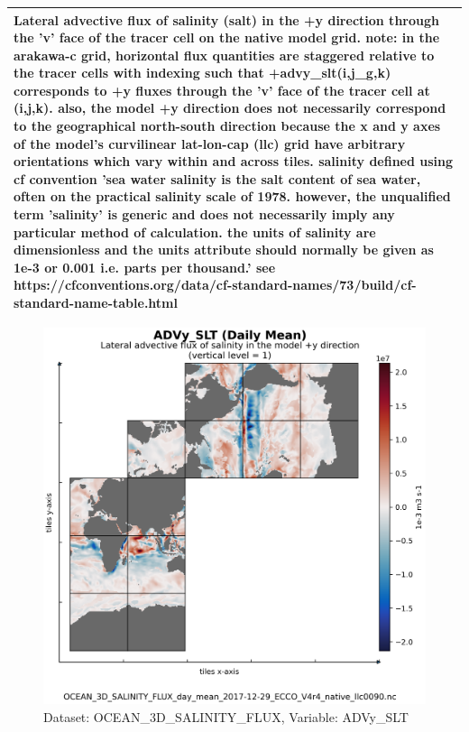 \begin{longtable}{|m{}|m{}|m{}|m{}|}
\multicolumn{4}{|p{1\textwidth}|}{\footnotesize{{Lateral advective flux of salinity (salt) in the +y direction through the 'v' face of the tracer cell on the native model grid. note: in the arakawa-c grid, horizontal flux quantities are staggered relative to the tracer cells with indexing such that +advy\_slt(i,j\_g,k) corresponds to +y fluxes through the 'v' face of the tracer cell at (i,j,k). also, the model +y direction does not necessarily correspond to the geographical north-south direction because the x and y axes of the model's curvilinear lat-lon-cap (llc) grid have arbitrary orientations which vary within and across tiles. salinity defined using cf convention 'sea water salinity is the salt content of sea water, often on the practical salinity scale of 1978. however, the unqualified term 'salinity' is generic and does not necessarily imply any particular method of calculation. the units of salinity are dimensionless and the units attribute should normally be given as 1e-3 or 0.001 i.e. parts per thousand.' see https://cfconventions.org/data/cf-standard-names/73/build/cf-standard-name-table.html}}} \\ \hline
\end{longtable}

\begin{figure}[H]
\centering
\includegraphics[scale=0.55]{../images/plots/native_plots/Ocean_Three-Dimensional_Salinity_Fluxes/ADVy_SLT.png}
\caption{Dataset: OCEAN\_3D\_SALINITY\_FLUX, Variable: ADVy\_SLT}
\label{tab:table-OCEAN_3D_SALINITY_FLUX_ADVy_SLT-Plot}
\end{figure}
\newpage
\pagebreak
